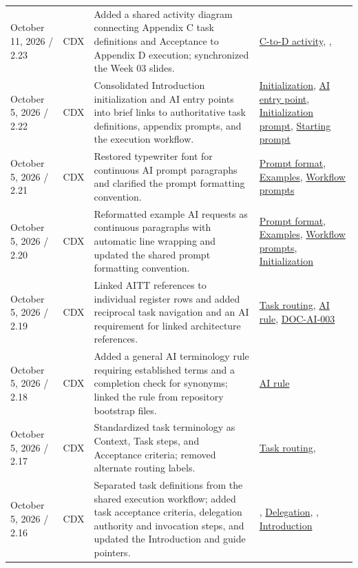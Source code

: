 \begin{tabularx}{\linewidth}{L{3.1cm}L{2.2cm}YL{2.0cm}}
October 11, 2026 / 2.23 & CDX & Added a shared activity diagram connecting Appendix C task definitions and Acceptance to Appendix D execution; synchronized the Week 03 slides. & \hyperref[Figure:AITaskExecutionActivity]{C-to-D activity}, , \\
October 5, 2026 / 2.22 & CDX & Consolidated Introduction initialization and AI entry points into brief links to authoritative task definitions, appendix prompts, and the execution workflow. & \hyperref[Section:InitializeNewProject]{Initialization}, \hyperref[Section:UsingTemplateAI]{AI entry point}, \hyperref[Section:AIInitializePrompt]{Initialization prompt}, \hyperref[Section:AIStartSelectedTaskPrompt]{Starting prompt}\\
October 5, 2026 / 2.21 & CDX & Restored typewriter font for continuous AI prompt paragraphs and clarified the prompt formatting convention. & \hyperref[Section:AIPromptFormatting]{Prompt format}, \hyperref[Section:AIExamplePrompts]{Examples}, \hyperref[Section:AIImplementationStart]{Workflow prompts}\\
October 5, 2026 / 2.20 & CDX & Reformatted example AI requests as continuous paragraphs with automatic line wrapping and updated the shared prompt formatting convention. & \hyperref[Section:AIPromptFormatting]{Prompt format}, \hyperref[Section:AIExamplePrompts]{Examples}, \hyperref[Section:AIImplementationStart]{Workflow prompts}, \hyperref[Section:InitializeNewProject]{Initialization}\\
October 5, 2026 / 2.19 & CDX & Linked AITT references to individual register rows and added reciprocal task navigation and an AI requirement for linked architecture references. & \hyperref[Table:AISkills]{Task routing}, \hyperref[Rule:AIReferenceLinks]{AI rule}, \hyperref[Requirement:DOCAI003]{DOC-AI-003}\\
October 5, 2026 / 2.18 & CDX & Added a general AI terminology rule requiring established terms and a completion check for synonyms; linked the rule from repository bootstrap files. & \hyperref[Rule:AITerminologyConsistency]{AI rule}\\
October 5, 2026 / 2.17 & CDX & Standardized task terminology as Context, Task steps, and Acceptance criteria; removed alternate routing labels. & \hyperref[Table:AISkills]{Task routing}, \\
October 5, 2026 / 2.16 & CDX & Separated task definitions from the shared execution workflow; added task acceptance criteria, delegation authority and invocation steps, and updated the Introduction and guide pointers. & , \hyperref[Section:AIAgentDelegation]{Delegation}, , \hyperref[Section:InitializeNewProject]{Introduction}\\

\end{tabularx}
